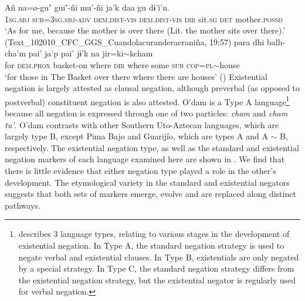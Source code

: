 \documentclass[output=paper,draft,draftmode,colorlinks,citecolor=brown]{langscibook}
\begin{document}
\ea
\label{ex:odam-intromom}
\gll Añ 		na=\o-guʼ 		guiʼ-ñi 			mu’-ñi 	ja’k	daa gu 	dɨ’i’n.\\
	\textsc{1sg.sbj} 	\textsc{sub=3sg.sbj-adv} 	\textsc{dem.dist-vis} 	\textsc{dem.dist-vis}	\textsc{dir} 	sit.\textsc{sg} \textsc{det}	mother.\textsc{possd}\\
\glt ‘As for me, because the mother is over there (Lit. the mother sits over there).’
(Text\_102010\_CFC\_GGS\_Cuandolacuranderaeraniña, 19:57)
\z 
\ea
\label{ex:odam-introbask}
\gll para 	dhi 	balh-cha'm     		pai'  	ja'p 	pai'    	jɨ'k 	na	jir=ki$\sim$kcham\\
	for  	\textsc{dem.prox} 	basket-on 	where 	\textsc{dir} 	where  some 	\textsc{sub} 	\textsc{cop=pl}$\sim$house\\
\glt ‘for those in The Basket over there where there are houses’ (\citealt{garciaeinrev})
\z
Existential negation is largely attested as clausal negation, although preverbal (as opposed to postverbal) constituent negation is also attested. O’dam is a Type A language\footnote{\citet{Croft1991} describes 3 language types, relating to various stages in the development of existential negation. In Type A, the standard negation strategy is used to negate verbal and existential clauses. In Type B, existentials are only negated by a special strategy. In Type C, the standard negation strategy differs from the existential negation strategy, but the existential negator is regularly used for verbal negation.} because all negation is expressed through one of two particles: \emph{cham} and \emph{cham tu’}. O’dam contrasts with other Southern Uto-Aztecan languages, which are largely type B, except Pima Bajo and Guarijío, which are types A and A $\sim$ B, respectively. The existential negation type, as well as the standard and existential negation markers of each language examined here are shown in . We find that there is little evidence that either negation type played a role in the other's development. The etymological variety in the standard and existential negators suggests that both sets of markers emerge, evolve and are replaced along distinct pathways.
\end{document}
